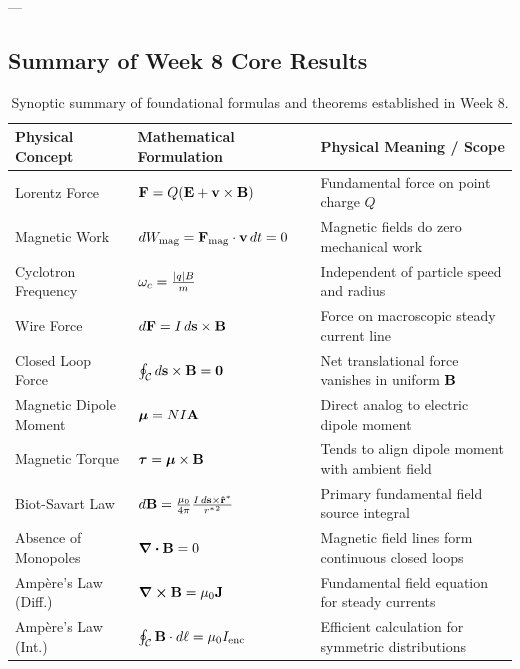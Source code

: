 ---

\subsection{Summary of Week 8 Core Results}

\begin{table}[htbp]
    \centering
    \renewcommand{\arraystretch}{1.5}
    \small
    \begin{tabular}{lll}
        \hline
        \textbf{Physical Concept} & \textbf{Mathematical Formulation} & \textbf{Physical Meaning / Scope} \\
        \hline
        Lorentz Force & $\vb{F} = Q(\vb{E} + \vb{v}\times\vb{B})$ & Fundamental force on point charge $Q$ \\
        Magnetic Work & $dW_{\mathrm{mag}} = \vb{F}_{\mathrm{mag}} \cdot \vb{v}\,dt = 0$ & Magnetic fields do zero mechanical work \\
        Cyclotron Frequency & $\omega_c = \frac{\abs{q}B}{m}$ & Independent of particle speed and radius \\
        Wire Force & $d\vb{F} = I\,d\vb{s} \times \vb{B}$ & Force on macroscopic steady current line \\
        Closed Loop Force & $\oint_{\mathcal{C}} d\vb{s} \times \vb{B} = \vb{0}$ & Net translational force vanishes in uniform $\vb{B}$ \\
        Magnetic Dipole Moment & $\bm{\mu} = N I \vb{A}$ & Direct analog to electric dipole moment \\
        Magnetic Torque & $\bm{\tau} = \bm{\mu} \times \vb{B}$ & Tends to align dipole moment with ambient field \\
        Biot-Savart Law & $d\vb{B} = \frac{\mu_0}{4\pi}\frac{I\,d\vb{s}\times\vu{r}^*}{{r^*}^2}$ & Primary fundamental field source integral \\
        Absence of Monopoles & $\div\vb{B} = 0$ & Magnetic field lines form continuous closed loops \\
        Ampère's Law (Diff.) & $\curl\vb{B} = \mu_0 \vb{J}$ & Fundamental field equation for steady currents \\
        Ampère's Law (Int.) & $\oint_{\mathcal{C}} \vb{B}\cdot d\vb{\ell} = \mu_0 I_{\mathrm{enc}}$ & Efficient calculation for symmetric distributions \\
        \hline
    \end{tabular}
    \caption{Synoptic summary of foundational formulas and theorems established in Week 8.}
    \label{tab:week8_summary}
\end{table}

